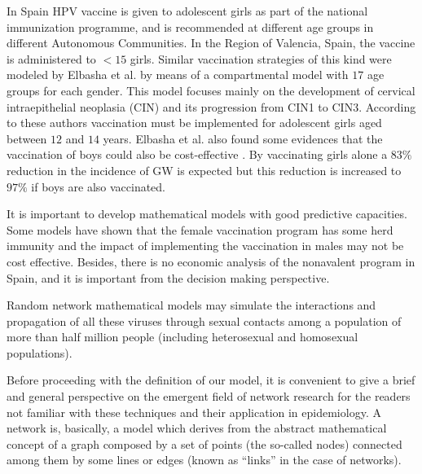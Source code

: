 In Spain HPV vaccine is given to adolescent girls as part of the national immunization programme, and is recommended at different age groups in different Autonomous Communities.
In the Region of Valencia, Spain, the vaccine is administered to $< 15$ girls. Similar vaccination strategies of this kind were modeled by Elbasha et al. \cite{elbasha2007model,elbasha2005vaccination} by means of a compartmental model with $17$ age groups for each gender. This model focuses mainly on the development of cervical intraepithelial neoplasia (CIN) and its progression from CIN1 to CIN3. According to these authors vaccination must be implemented for adolescent girls aged between $12$ and $14$ years. Elbasha et al. also found some evidences that the vaccination of boys could also be cost-effective \cite{elbasha2007model}. By vaccinating girls alone a $83\%$ reduction in the incidence of GW is expected but this reduction is increased to $97\%$ if boys are also vaccinated.

It is important to develop mathematical models with good predictive capacities. Some models have shown that the female vaccination program has some herd immunity and the impact of implementing the vaccination in males may not be cost effective. Besides, there is no economic analysis of the nonavalent program in Spain, and it is important from the decision making perspective.

Random network mathematical models may simulate the interactions and propagation of all these viruses through sexual contacts among a population of more than half million people (including heterosexual and homosexual populations). 

Before proceeding with the definition of our model, it is convenient to give a brief and general perspective on the emergent field of network research for the readers not familiar with these techniques and their application in epidemiology. A network is, basically, a model which derives from the abstract mathematical concept of a graph composed by a set of points (the so-called nodes) connected among them by some lines or edges (known as ``links'' in the case of networks).


